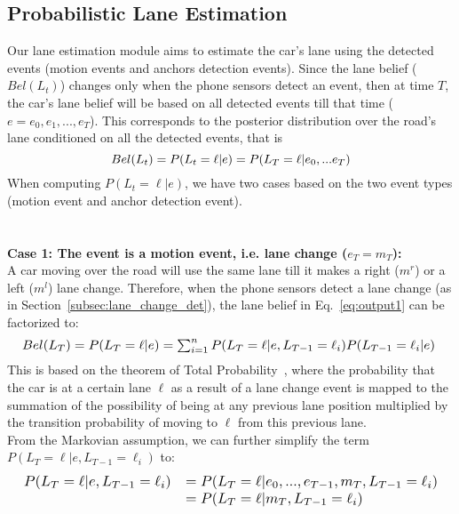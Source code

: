 \documentclass[10pt, conference, compsocconf]{IEEEtran}
\begin{document}
\subsection{Probabilistic Lane Estimation}\label{sec:prob_est}
Our lane estimation module aims to estimate the car's lane using the detected events (motion events and anchors detection events). Since the lane belief ($Bel(L_t)$) changes only when the phone sensors detect an event, then at time $T$, the car's lane belief will be based on all detected events till that time ($e= e_0,e_1,...,e_T$).  This corresponds to the posterior distribution over the road's lane conditioned on all the detected events, that is
\vspace*{-10pt}
\begin{equation}
Bel(L_t)= P(L_t=\ell|e) = P(L_T=\ell|e_0,...e_T)
\label{eq:output1}
\vspace*{-4pt}
\end{equation}
When computing  $P(L_t=\ell|e)$, we have two cases based on the two event types (motion event and anchor detection event).
\\
\\
\\
\textbf{Case 1: The event is a motion event, i.e. lane change ($e_T=m_T$):}
\\
A car moving over the road will use the same lane till it makes a right ($m^r$) or a left ($m^l$) lane change.
 Therefore, when the phone sensors detect a lane change (as in Section~\ref{subsec:lane_change_det}), the lane belief in
Eq.~\ref{eq:output1} can be factorized to:
\begin{equation}
\resizebox{\columnwidth}{!}{
$Bel(L_T)= P(L_T=\ell|e) = \sum_{i=1}^{n} P(L_T = \ell|e,L_{T-1}=\ell_i)P(L_{T-1}=\ell_i|e)$
\label{eq:total_pr}
}
\end{equation}
This is based on the theorem of Total Probability~\cite{ang2004probability}, where the probability that the car is at a certain lane $\ell$ as a result of a lane change event is mapped to the summation of the possibility of being at any previous lane position multiplied by the transition probability of moving to $\ell$ from this previous lane.
\\
From the Markovian assumption, we can further simplify the term $P(L_T = \ell|e,L_{T-1}=\ell_i)$ to:
\begin{equation}\resizebox{\columnwidth}{!}{$\displaystyle \begin{array}{ll}
P(L_T=\ell|e,L_{T-1}=\ell_i) & = P(L_T = \ell|e_0,...,e_{T-1},m_T,L_{T-1}=\ell_i)\\
 &= P(L_T=\ell|m_T,L_{T-1}=\ell_i)\\
 \end{array}
$}\end{equation}
\end{document}
